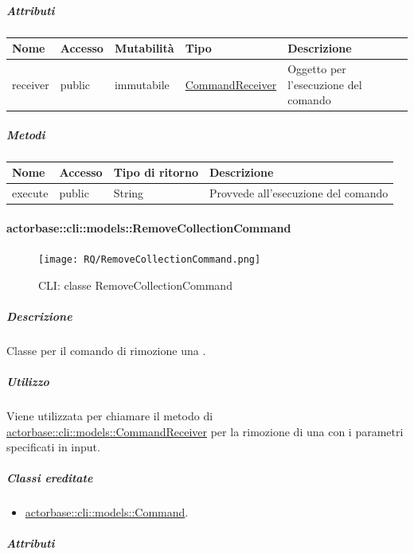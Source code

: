 \documentclass{scalatekids-article}
\begin{document}
\subparagraph{Attributi}

\begin{tabular}{| p{1cm} | p{1.5cm} | p{2cm} | p{4cm} | p{8.5cm} |}
  \hline
  Nome & Accesso & Mutabilità & Tipo & Descrizione\\
  \hline
  receiver & public & immutabile & \hyperref[sec:actorbase::cli::models::CommandReceiver]{CommandReceiver} & Oggetto per l'esecuzione del comando\\
  \hline
\end{tabular}

\subparagraph{Metodi}

\begin{tabular}{| l | l | l | l |}
  \hline
  Nome & Accesso & Tipo di ritorno & Descrizione\\
  \hline
  execute & public & String & Provvede all'esecuzione del comando\\
  \hline
\end{tabular}

\paragraph{actorbase::cli::models::RemoveCollectionCommand}
\label{sec:actorbase::cli::models::RemoveCollectionCommand}

\begin{figure}[H]
  \begin{center}
    \texttt{[image: RQ/RemoveCollectionCommand.png]}
    \caption{CLI: classe RemoveCollectionCommand}
  \end{center}
\end{figure}

\subparagraph{Descrizione}

Classe per il comando di rimozione una .

\subparagraph{Utilizzo}

Viene utilizzata per chiamare il metodo di
\hyperref[sec:actorbase::cli::models::CommandReceiver]{actorbase::cli::models::CommandReceiver} per la rimozione di una  con
i parametri specificati in input.

\subparagraph{Classi ereditate}

\begin{itemize}
\item \hyperref[sec:actorbase::cli::models::Command]{actorbase::cli::models::Command}.
\end{itemize}

\subparagraph{Attributi}
\end{document}
